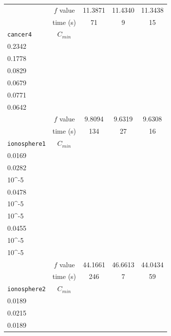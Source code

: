 \begin{table}[H]
\begin{tabular}{|l|c|c|c|c|}
	& \(f\) value & 11.3871 & 11.4340 & 11.3438\\
	& time (s)& 71 & 9 & 15\\
	\hline
	\texttt{cancer4}& \(C_{min}\) & \(\begin{pmatrix}0.0476\\0.2342\\0.1778\end{pmatrix}\) & \(\begin{pmatrix}0.0219\\0.0829\\0.0679\end{pmatrix}\) & \(\begin{pmatrix}0.0202\\0.0771\\0.0642\end{pmatrix}\) \\
	& \(f\) value & 9.8094 & 9.6319 & 9.6308\\
	& time (s)& 134 & 27 & 16\\
	\hline
	\texttt{ionosphere1}& \(C_{min}\) & \(\begin{pmatrix}0.0078\\0.0169\\0.0282\\10^{-5}\end{pmatrix}\) & \(\begin{pmatrix}10^{-5}\\0.0478\\10^{-5}\\10^{-5}\end{pmatrix}\) & \(\begin{pmatrix}0.0074\\0.0455\\10^{-5}\\10^{-5}\end{pmatrix}\) \\
	& \(f\) value & 44.1661 & 46.6613 & 44.0434\\
	& time (s)& 246 & 7 & 59\\
	\hline
	\texttt{ionosphere2}& \(C_{min}\) & \(\begin{pmatrix}0.0116\\0.0189\end{pmatrix}\) & \(\begin{pmatrix}10^{-5}\\0.0215\end{pmatrix}\) & \(\begin{pmatrix}0.0116\\0.0189\end{pmatrix}\) \\

\end{tabular}
\end{table}
